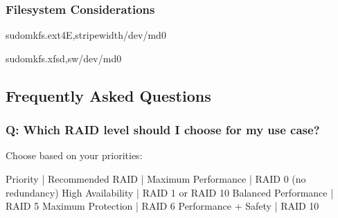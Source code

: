 \documentclass[letterpaper,10pt,english]{sphinxmanual}
\begin{document}
\subsubsection{Filesystem Considerations}
\label{\detokenize{raid-systems:filesystem-considerations}}
\begin{sphinxVerbatim}[commandchars=\\\{\}]

sudomkfs.ext4\PYGZhy{}E,stripe\PYGZhy{}width/dev/md0

sudomkfs.xfs\PYGZhy{}d,sw/dev/md0
\end{sphinxVerbatim}


\subsection{Frequently Asked Questions}
\label{\detokenize{raid-systems:frequently-asked-questions}}

\subsubsection{Q: Which RAID level should I choose for my use case?}
\label{\detokenize{raid-systems:q-which-raid-level-should-i-choose-for-my-use-case}}
\sphinxAtStartPar
{} Choose based on your priorities:

\begin{sphinxVerbatim}[commandchars=\\\{\}]
Priority              | Recommended RAID
\PYGZhy{}\PYGZhy{}\PYGZhy{}\PYGZhy{}\PYGZhy{}\PYGZhy{}\PYGZhy{}\PYGZhy{}\PYGZhy{}\PYGZhy{}\PYGZhy{}\PYGZhy{}\PYGZhy{}\PYGZhy{}\PYGZhy{}\PYGZhy{}\PYGZhy{}\PYGZhy{}\PYGZhy{}\PYGZhy{}\PYGZhy{}|\PYGZhy{}\PYGZhy{}\PYGZhy{}\PYGZhy{}\PYGZhy{}\PYGZhy{}\PYGZhy{}\PYGZhy{}\PYGZhy{}\PYGZhy{}\PYGZhy{}\PYGZhy{}\PYGZhy{}\PYGZhy{}\PYGZhy{}\PYGZhy{}\PYGZhy{}\PYGZhy{}
Maximum Performance  | RAID 0 (no redundancy)
High Availability    | RAID 1 or RAID 10
Balanced Performance | RAID 5
Maximum Protection   | RAID 6
Performance + Safety | RAID 10
\end{sphinxVerbatim}
\end{document}
